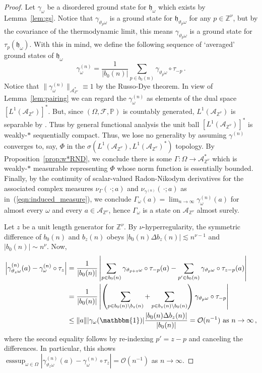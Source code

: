 \documentclass{article}
\DeclareMathOperator*{\esssup}{\mathrm{esssup}}
\newcommand{\one}{\mathbbm{1}}
\newcommand{\Znu}{\mathbb{Z}^\nu}
\newcommand{\A}{\mathcal{A}}
\renewcommand{\P}{\mathbb{P}}
\newcommand{\<}{\langle}
\renewcommand{\>}{\rangle}
\newcommand{\h}{\mathfrak{h}}
\theoremstyle{definition}
\numberwithin{equation}{section}
\begin{document}
\begin{proof}
	Let $\gamma_\omega$ be a disordered ground state for $\h_\omega$ which exists by Lemma~\ref{lem:gs}. Notice that $\gamma_{\vartheta_p\omega}$ is a ground state for $\h_{\vartheta_p\omega}$ for any $p\in \Znu$, but by the covariance of the thermodynamic limit, this means $\gamma_{\vartheta_p\omega}$ is a ground state for $\tau_p(\h_\omega)$. With this in mind, we define the following sequence of `averaged' ground states of $\h_\omega$
	\begin{equation}
		\gamma^{(n)}_\omega = \frac{1}{|b_0(n)|} \sum_{p\in b_0(n)} \gamma_{\vartheta_p \omega} \circ \tau_{-p}\,.
	\end{equation} Notice that $\|\gamma^{(n)}_\omega\|_{\A_{\Znu}^*} \equiv 1$ by the Russo-Dye theorem. In view of Lemma~\ref{lem:pairing} we can regard the $\gamma^{(n)}_\omega$ as elements of the dual space $[L^1(\A_{\Znu})]^*$. But, since $(\Omega, \mathcal{F}, \P)$ is countably generated, $L^1(\A_{\Znu})$ is separable by \cite[Proposition 1.2.29]{Hytonen_et_al_vol1}. Thus by general functional analysis the unit ball $[L^1(\A_{\Znu})]^*$ is weakly-$\ast$ sequentially compact. Thus, we lose no generality by assuming $\gamma^{(n)}$ converges to, say, $\Phi$ in the $\sigma(L^1(\A_{\Znu}), L^1(\A_{\Znu})^*)$ topology. By Proposition~\ref{prop:w*RND}, we conclude there is some $\Gamma:\Omega \to \A_{\Znu}^*$ which is weakly-$\ast$ measurable representing $\Phi$ whose norm function is essentially bounded. Finally, by the continuity of scalar-valued Radon-Nikodym derivatives \cite{Bermudezet_al} for the associated complex measures $\nu_{\Gamma}(\, \cdot; a)$ and $\nu_{\gamma^{(n)}}(\,\cdot;a)$ as in~(\ref{eqn:induced_measure}), we conclude $\Gamma_\omega(a) = \lim_{n\to \infty} \gamma^{(n)}_\omega(a)$ for almost every $\omega$ and every $a\in \A_{\Znu}$, hence $\Gamma_\omega$ is a state on $\A_{\Znu}$ almost surely.  
	
	Let $z$ be a unit length generator for $\Znu$. By $\nu$-hyperregularity, the symmetric difference of $b_0(n)$ and $b_z(n)$ obeys $|b_0(n)\Delta b_z(n)| \lesssim n^{\nu-1} $ and $|b_0(n)| \sim n^\nu$. Now, 
	\begin{align*}
		\left| \gamma^{(n)}_{\vartheta_z\omega}(a) - \gamma^{(n)}_\omega \circ \tau_z\right| & = \frac{1}{|b_0(n)|} \left|\sum_{p\in b_0(n)} \gamma_{\vartheta_{p+z}\omega} \circ \tau_{-p}(a) - \sum_{p'\in b_0(n)} \gamma_{\vartheta_p \omega} \circ \tau_{z-p}(a) \right|\\
		&= \frac{1}{|b_0(n)|} \left| \left(\sum_{p\in b_0(n) \setminus b_z(n)} + \sum_{p\in b_z(n) \setminus b_0(n)} \right)\gamma_{\vartheta_p \omega}\circ \tau_{-p}\right|\\
		&\le \|a\| |\gamma_\omega(\one)| \frac{|b_0(n) \Delta b_z(n)|}{|b_0(n)|} = \mathcal{O}(n^{-1}) \text{ as }n\to \infty\,,
	\end{align*} where the second equality follows by re-indexing $p' = z-p$ and canceling the differences. In particular, this shows $\esssup_{\omega\in \Omega} \left| \gamma^{(n)}_{\vartheta_z\omega}(a) - \gamma^{(n)}_\omega \circ \tau_z\right| = \mathcal{O}(n^{-1})$ as $n\to \infty$.
	

\end{proof}
\end{document}
